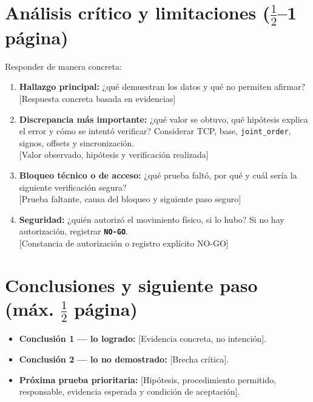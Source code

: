 \documentclass[10pt, a4paper]{article}
\newcommand{\campo}[1]{{\ttfamily\small[#1]}}
\begin{document}
\section{Análisis crítico y limitaciones \texorpdfstring{{\small\normalfont($\frac{1}{2}$--1 página)}}{(1/2-1 página)}}

Responder de manera concreta:
\begin{enumerate}
    \setlength{\itemsep}{4pt}\setlength{\parskip}{0pt}
    \item \textbf{Hallazgo principal:} ¿qué demuestran los datos y qué no permiten afirmar?\\
    \campo{Respuesta concreta basada en evidencias}

    \item \textbf{Discrepancia más importante:} ¿qué valor se obtuvo, qué hipótesis explica el error y cómo se intentó verificar? Considerar TCP, base, \texttt{joint\_order}, signos, offsets y sincronización.\\
    \campo{Valor observado, hipótesis y verificación realizada}

    \item \textbf{Bloqueo técnico o de acceso:} ¿qué prueba faltó, por qué y cuál sería la siguiente verificación segura?\\
    \campo{Prueba faltante, causa del bloqueo y siguiente paso seguro}

    \item \textbf{Seguridad:} ¿quién autorizó el movimiento físico, si lo hubo? Si no hay autorización, registrar \textbf{\texttt{NO-GO}}.\\
    \campo{Constancia de autorización o registro explícito NO-GO}
\end{enumerate}

\section{Conclusiones y siguiente paso \texorpdfstring{{\small\normalfont(máx. $\frac{1}{2}$ página)}}{(máx. 1/2 página)}}

\begin{itemize}
    \setlength{\itemsep}{3pt}\setlength{\parskip}{0pt}
    \item \textbf{Conclusión 1 — lo logrado:} \campo{Evidencia concreta, no intención}.
    \item \textbf{Conclusión 2 — lo no demostrado:} \campo{Brecha crítica}.
    \item \textbf{Próxima prueba prioritaria:} \campo{Hipótesis, procedimiento permitido, responsable, evidencia esperada y condición de aceptación}.
\end{itemize}
\end{document}
